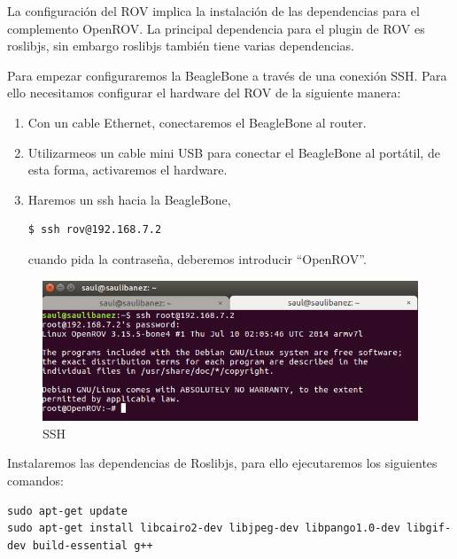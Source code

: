 La configuración del ROV implica la instalación de las dependencias para el complemento OpenROV. La principal dependencia para el plugin de ROV es roslibjs, sin embargo roslibjs también tiene varias dependencias.

Para empezar configuraremos la BeagleBone a través de una conexión SSH. Para ello necesitamos configurar el hardware del ROV de la siguiente manera:

\begin{enumerate}
\item Con un cable Ethernet, conectaremos el BeagleBone al router.
\item Utilizarmeos un cable mini USB para conectar el BeagleBone al portátil, de esta forma, activaremos el hardware.
\item Haremos un ssh hacia la BeagleBone, 
\renewcommand{\lstlistingname}{}
\begin{lstlisting}[caption=SSH, label={lst:ssh}]
$ ssh rov@192.168.7.2
\end{lstlisting}
cuando pida la contraseña, deberemos introducir “OpenROV”.
\end{enumerate}

\begin{figure} [hbtp]
  \begin{center}
    \includegraphics[width=12cm]{img/cap4/ssh}
  \end{center}
  \caption{SSH}
  \label{fig:ssh}
\end{figure}

Instalaremos las dependencias de Roslibjs, para ello ejecutaremos los siguientes comandos:

\renewcommand{\lstlistingname}{}
\begin{lstlisting}[caption=Dependencias Roslibjs, label={lst:roslibjs}]
sudo apt-get update 
sudo apt-get install libcairo2-dev libjpeg-dev libpango1.0-dev libgif-dev build-essential g++
\end{lstlisting}

